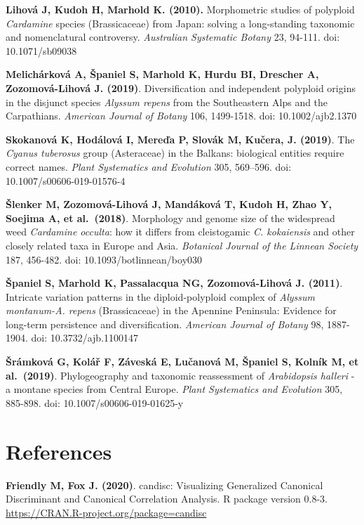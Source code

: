 \documentclass[
]{article}
\begin{document}
\textbf{Lihová J, Kudoh H, Marhold K. (2010).} Morphometric studies of
polyploid \emph{Cardamine} species (Brassicaceae) from Japan: solving a
long-standing taxonomic and nomenclatural controversy. \emph{Australian
Systematic Botany} 23, 94-111. doi: 10.1071/sb09038

\textbf{Melichárková A, Španiel S, Marhold K, Hurdu BI, Drescher A,
Zozomová-Lihová J. (2019)}. Diversification and independent polyploid
origins in the disjunct species \emph{Alyssum repens} from the
Southeastern Alps and the Carpathians. \emph{American Journal of Botany}
106, 1499-1518. doi: 10.1002/ajb2.1370

\textbf{Skokanová K, Hodálová I, Mereďa P, Slovák M, Kučera, J. (2019)}.
The \emph{Cyanus tuberosus} group (Asteraceae) in the Balkans:
biological entities require correct names. \emph{Plant Systematics and
Evolution} 305, 569--596. doi: 10.1007/s00606-019-01576-4

\textbf{Šlenker M, Zozomová-Lihová J, Mandáková T, Kudoh H, Zhao Y,
Soejima A, et al.~(2018)}. Morphology and genome size of the widespread
weed \emph{Cardamine occulta}: how it differs from cleistogamic \emph{C.
kokaiensis} and other closely related taxa in Europe and Asia.
\emph{Botanical Journal of the Linnean Society} 187, 456-482. doi:
10.1093/botlinnean/boy030

\textbf{Španiel S, Marhold K, Passalacqua NG, Zozomová-Lihová J.
(2011)}. Intricate variation patterns in the diploid-polyploid complex
of \emph{Alyssum montanum-A. repens} (Brassicaceae) in the Apennine
Peninsula: Evidence for long-term persistence and diversification.
\emph{American Journal of Botany} 98, 1887-1904. doi:
10.3732/ajb.1100147

\textbf{Šrámková G, Kolář F, Záveská E, Lučanová M, Španiel S, Kolník M,
et al.~(2019)}. Phylogeography and taxonomic reassessment of
\emph{Arabidopsis halleri} - a montane species from Central Europe.
\emph{Plant Systematics and Evolution} 305, 885-898. doi:
10.1007/s00606-019-01625-y

\hypertarget{references}{%
\section{References}\label{references}}

\textbf{Friendly M, Fox J. (2020)}. candisc: Visualizing Generalized
Canonical Discriminant and Canonical Correlation Analysis. R package
version 0.8-3. \url{https://CRAN.R-project.org/package=candisc}
\end{document}

